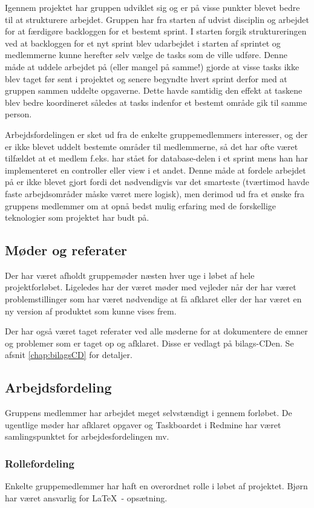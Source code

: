 Igennem projektet har gruppen udviklet sig og er på visse punkter blevet bedre til at strukturere arbejdet. Gruppen har fra starten af udvist disciplin og arbejdet for at færdigøre backloggen for et bestemt sprint. I starten forgik struktureringen ved at backloggen for et nyt sprint blev udarbejdet i starten af sprintet og medlemmerne kunne herefter selv vælge de tasks som de ville udføre. Denne måde at uddele arbejdet på (eller mangel på samme!) gjorde at visse tasks ikke blev taget før sent i projektet og senere begyndte hvert sprint derfor med at gruppen sammen uddelte opgaverne. Dette havde samtidig den effekt at taskene blev bedre koordineret således at tasks indenfor et bestemt område gik til samme person. 

Arbejdsfordelingen er sket ud fra de enkelte gruppemedlemmers interesser, og der er ikke blevet uddelt bestemte områder til medlemmerne, så det har ofte været tilfældet at et medlem f.eks. har stået for database-delen i et sprint mens han har implementeret en controller eller view i et andet. Denne måde at fordele arbejdet på er ikke blevet gjort fordi det nødvendigvis var det smarteste (tværtimod havde faste arbejdsområder måske været mere logisk), men derimod ud fra et ønske fra gruppens medlemmer om at opnå bedst mulig erfaring med de forskellige teknologier som projektet har budt på.

\subsection{Møder og referater}
Der har været afholdt gruppemøder næsten hver uge i løbet af hele projektforløbet. Ligeledes har der været møder med vejleder når der har været problemstillinger som har været nødvendige at få afklaret eller der har været en ny version af produktet som kunne vises frem.

Der har også været taget referater ved alle møderne for at dokumentere de emner og problemer som er taget op og afklaret. Disse er vedlagt på bilags-CDen. Se afsnit \ref{chap:bilagsCD} for detaljer.

\subsection{Arbejdsfordeling}
Gruppens medlemmer har arbejdet meget selvstændigt i gennem forløbet. De ugentlige møder har afklaret opgaver og Taskboardet i Redmine har været samlingspunktet for arbejdesfordelingen mv.

\subsubsection{Rollefordeling}
Enkelte gruppemedlemmer har haft en overordnet rolle i løbet af projektet. Bjørn har været ansvarlig for \LaTeX\ - opsætning.
